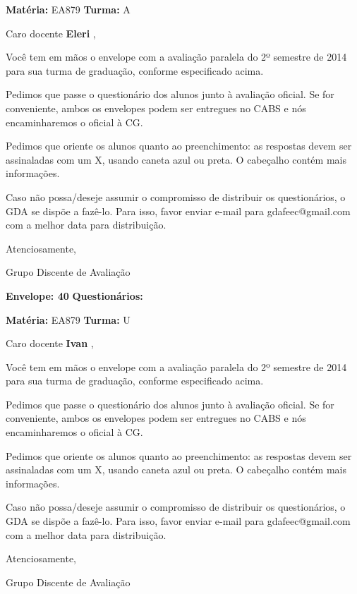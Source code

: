 \documentclass[a5paper]{letter}
\begin{document}
\newpage
\thispagestyle{empty}

\hfill {\bf Matéria:} EA879 {\bf Turma:} A

Caro docente {\bf Eleri }, 

	Você tem em mãos o envelope com a avaliação paralela do 2º semestre de 2014 para sua turma de graduação, conforme especificado acima.

	Pedimos que passe o questionário dos alunos junto à avaliação oficial. Se for conveniente, ambos os envelopes podem ser entregues no CABS e nós encaminharemos o oficial à CG.

Pedimos que oriente os alunos quanto ao preenchimento: as respostas devem ser assinaladas com um X, usando caneta azul ou preta. O cabeçalho contém mais informações.

	Caso não possa/deseje assumir o compromisso de distribuir os questionários, o GDA se dispõe a fazê-lo. Para isso, favor enviar e-mail para gdafeec@gmail.com com a melhor data para distribuição.


Atenciosamente, 

Grupo Discente de Avaliação

\vspace{0.5cm}

{\bf Envelope: 40 }		\hfill	{\bf Questionários:} \hspace{2cm}

\newpage
\thispagestyle{empty}

\hfill {\bf Matéria:} EA879 {\bf Turma:} U

Caro docente {\bf Ivan }, 

	Você tem em mãos o envelope com a avaliação paralela do 2º semestre de 2014 para sua turma de graduação, conforme especificado acima.

	Pedimos que passe o questionário dos alunos junto à avaliação oficial. Se for conveniente, ambos os envelopes podem ser entregues no CABS e nós encaminharemos o oficial à CG.

Pedimos que oriente os alunos quanto ao preenchimento: as respostas devem ser assinaladas com um X, usando caneta azul ou preta. O cabeçalho contém mais informações.

	Caso não possa/deseje assumir o compromisso de distribuir os questionários, o GDA se dispõe a fazê-lo. Para isso, favor enviar e-mail para gdafeec@gmail.com com a melhor data para distribuição.


Atenciosamente, 

Grupo Discente de Avaliação
\end{document}
